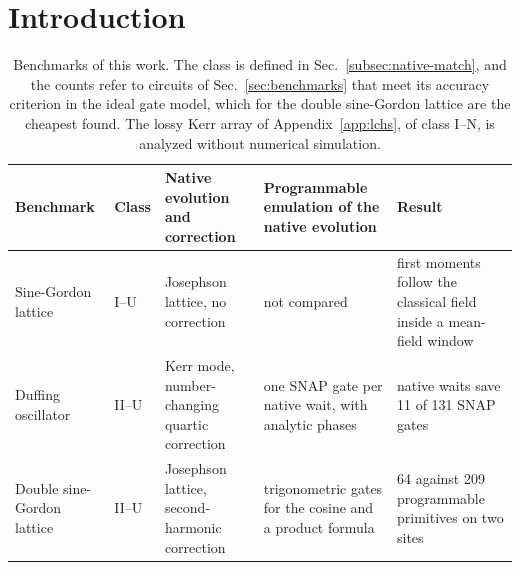 \documentclass[pra,twocolumn,superscriptaddress,nofootinbib,floatfix]{revtex4-2}
\theoremstyle{remark}
\begin{document}
\section{Introduction}
\label{sec:intro}

\begin{table}[t]
\caption{Benchmarks of this work. The class is defined in Sec.~\ref{subsec:native-match}, and the counts refer to circuits of Sec.~\ref{sec:benchmarks} that meet its accuracy criterion in the ideal gate model, which for the double sine-Gordon lattice are the cheapest found. The lossy Kerr array of Appendix~\ref{app:lchs}, of class I--N, is analyzed without numerical simulation.}
\label{tab:classes}
\begin{ruledtabular}
\begin{tabular}{L{2.5cm}L{0.8cm}L{3.5cm}L{4.1cm}L{4.4cm}}
Benchmark & Class & Native evolution and correction & Programmable emulation of the native evolution & Result \\
\hline
Sine-Gordon lattice & I--U & Josephson lattice, no correction & not compared & first moments follow the classical field inside a mean-field window \\
Duffing oscillator & II--U & Kerr mode, number-changing quartic correction & one SNAP gate per native wait, with analytic phases & native waits save 11 of 131 SNAP gates \\
Double sine-Gordon lattice & II--U & Josephson lattice, second-harmonic correction & trigonometric gates for the cosine and a product formula & 64 against 209 programmable primitives on two sites \\
\end{tabular}
\end{ruledtabular}
\end{table}
\end{document}
